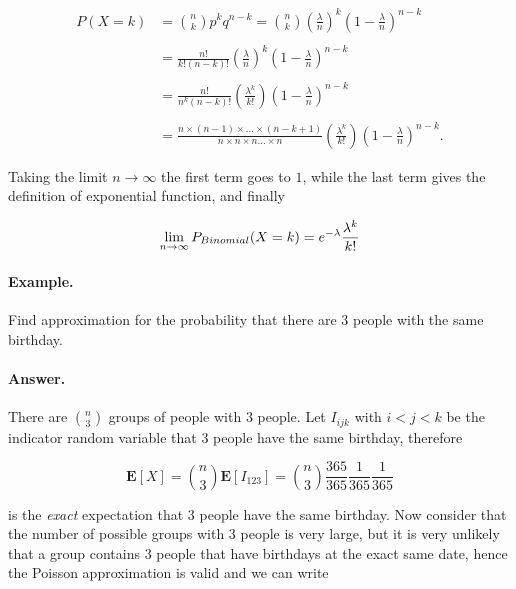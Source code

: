 \documentclass[12pt]{article}
\begin{document}
\begin{align}
P(X = k) &= 
{n \choose k}
p^{k} q^{n - k}
= {n \choose k} \left( \frac{\lambda}{n} \right)^{k}
\left( 1 - \frac{\lambda}{n} \right)^{n - k}
\nonumber \\
\nonumber \\
&= \frac{n!}{k! (n - k)!} 
\left( \frac{\lambda}{n} \right)^{k}
\left( 1 - \frac{\lambda}{n} \right)^{n - k}
\nonumber \\
\nonumber \\
&= \frac{n!}{n^{k} (n - k)!} 
\left( \frac{\lambda^{k}}{k!} \right)
\left( 1 - \frac{\lambda}{n} \right)^{n - k}
\nonumber \\
\nonumber \\
&= \frac{n \times (n-1) \times \ldots \times (n - k + 1)}{n \times n \times n \ldots \times n} 
\left( \frac{\lambda^{k}}{k!} \right)
\left( 1 - \frac{\lambda}{n} \right)^{n - k}.
\end{align}

\noindent
Taking the limit $n \to \infty$ the first term goes to $1$, while the last
term gives the definition of exponential function, and finally

\begin{equation}
\lim_{n \to \infty} P_{\tiny{Binomial}} (X = k ) = 
e^{- \lambda} \frac{\lambda^{k}}{k!}
\end{equation}

\paragraph{Example.}
Find approximation for the probability that there are $3$ people with the same 
birthday.

\paragraph{Answer.}
There are ${n \choose 3}$ groups of people with $3$ people. 
Let $I_{ijk}$ with $i < j < k$ be the indicator random variable that 
$3$ people have the same birthday, therefore

\begin{equation}
\mathbf{E} [ X ] =
{n \choose 3} \mathbf{E} [ I_{123} ] =
{n \choose 3}
\frac{365}{365} \frac{1}{365} \frac{1}{365}
\end{equation}

\noindent
is the \textit{exact} expectation that $3$ people have the same birthday.
Now consider that the number of possible groups with $3$ people 
is very large, but it is very unlikely that a group contains $3$ people
that have birthdays at the exact same date, hence the Poisson approximation
is valid and we can write
\end{document}
